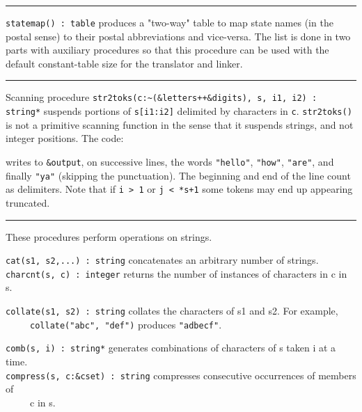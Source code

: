 \vspace{0.25cm}\hrule{}

\texttt{statemap() : table} produces a
"two-way" table to map state names (in the postal sense) to their postal abbreviations
and vice-versa. The list is done in two parts with auxiliary procedures
so that this procedure can be used with the default constant-table size
for the translator and linker. 

\vspace{0.25cm}\hrule{}

Scanning procedure \texttt{str2toks(c:\~{}(\&letters++\&digits),
s, i1, i2) : string*} suspends portions of \texttt{s[i1:i2]} delimited
by characters in \texttt{c}. \texttt{str2toks()} is not a primitive
scanning function in the sense that it suspends strings, and not
integer positions. The code:


\noindent writes to \texttt{\&output}, on successive lines, the words
\texttt{"hello"},
\texttt{"how"},
\texttt{"are"}, and finally
\texttt{"ya"} (skipping the punctuation).
The beginning and end of the line count as delimiters. Note
that if \texttt{i {\textgreater} 1} or \texttt{j {\textless} *s+1} some
tokens may end up appearing truncated.

\vspace{0.25cm}\hrule{}

These procedures perform operations on strings. 

\texttt{cat(s1, s2,...) : string} concatenates an arbitrary number of
strings.\\
\texttt{charcnt(s, c) : integer} returns the number of instances of
characters in c in s.

\texttt{collate(s1, s2) : string} collates the characters
of s1 and s2. For example,\\
 \ \ \ \ \ \texttt{collate("abc",
"def")} produces
\texttt{"adbecf"}.

\texttt{comb(s, i) : string*} generates combinations of characters of s taken i at a time.\\
\texttt{compress(s, c:\&cset) : string} compresses consecutive
occurrences of members of\\
 \ \ \ \ \ c in s.

